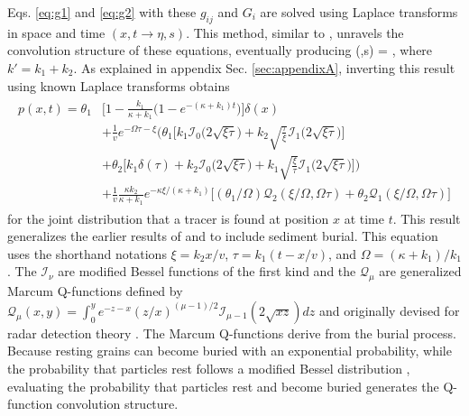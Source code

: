 Eqs. \ref{eq:g1} and \ref{eq:g2} with these $g_{ij}$ and $G_i$ are solved using Laplace transforms in space and time $(x,t \rightarrow 
\eta,s).$ This method, similar to \citet{Weeks1998}, unravels the convolution structure of these equations, eventually producing
\be {}(\eta,s) = , \label{eq:diffnicedist}\ee
where $k' = k_1 + k_2$. As explained in appendix Sec. \ref{sec:appendixA}, inverting this result using known Laplace transforms \citep{Prudnikov1992a,Arfken1985} obtains
\begin{align}
	\begin{split}
		p(x,t) = \theta_1&\Big[1-\frac{k_1}{\kappa+k_1}\Big(1-e^{-(\kappa+k_1)t}\Big)\Big]\delta(x) \\ &+ \frac{1}{v}e^{-\Omega \tau - \xi}\Big(\theta_1\Big[k_1\mathcal{I}_0\big(2\sqrt{\xi\tau}\big) + k_2\sqrt{\frac{\tau}{\xi}}\mathcal{I}_1\big(2\sqrt{\xi\tau}\big)\Big] \\ 
		&+ \theta_2\Big[k_1\delta(\tau) + k_2 \mathcal{I}_0\big(2\sqrt{\xi\tau}\big)+k_1 \sqrt{\frac{\xi}{\tau}}\mathcal{I}_1\big(2\sqrt{\xi\tau}\big)\Big]\Big) \\
		&+ \frac{1}{v}\frac{\kappa k_2}{\kappa + k_1}e^{-\kappa \xi/(\kappa + k_1)}\Big[(\theta_1/\Omega)\mathcal{Q}_2(\xi/\Omega,\Omega\tau) + \theta_2 \mathcal{Q}_1(\xi/\Omega,\Omega\tau)\Big]
		\label{eq:pdf}
	\end{split}
\end{align}
for the joint distribution that a tracer is found at position $x$ at time $t$.
This result generalizes the earlier results of \citet{Lisle1998} and \citet{Einstein1937} to include sediment burial.
This equation uses the shorthand notations $\xi = k_2 x/v$, $\tau = k_1(t-x/v)$, and $\Omega = (\kappa+k_1)/k_1$ \citep[cf.][]{Lisle1998}. The $\mathcal{I}_\nu$ are modified Bessel functions of the first kind and the $\mathcal{Q}_\mu$ are generalized Marcum Q-functions defined by $\mathcal{Q}_\mu(x,y) = \int_0^y e^{-z-x}(z/x)^{(\mu-1)/2}\mathcal{I}_{\mu-1}(2\sqrt{xz})dz $ and originally devised for radar detection theory \citep{Marcum1960,Temme1996}. 
The Marcum Q-functions derive from the burial process.
Because resting grains can become buried with an exponential probability, while the probability that particles rest follows a modified Bessel distribution \citep{Einstein1937,Lisle1998}, evaluating the probability that particles rest and become buried generates the Q-function convolution structure. 

